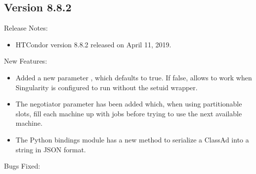 \subsection*{\label{sec:New-8-8-2}Version 8.8.2}

\noindent Release Notes:

\begin{itemize}

\item HTCondor version 8.8.2 released on April 11, 2019.

\end{itemize}


\noindent New Features:

\begin{itemize}

\item Added a new parameter , which defaults
to true.  If false, allows  to work when Singularity
is configured to run without the setuid wrapper.

\item The negotiator parameter 
has been added which, when using partitionable slots, fill each
machine up with jobs before trying to use the next available machine.

\item The Python bindings  module has
a new  method to serialize a ClassAd
into a string in JSON format.

\end{itemize}

\noindent Bugs Fixed:

